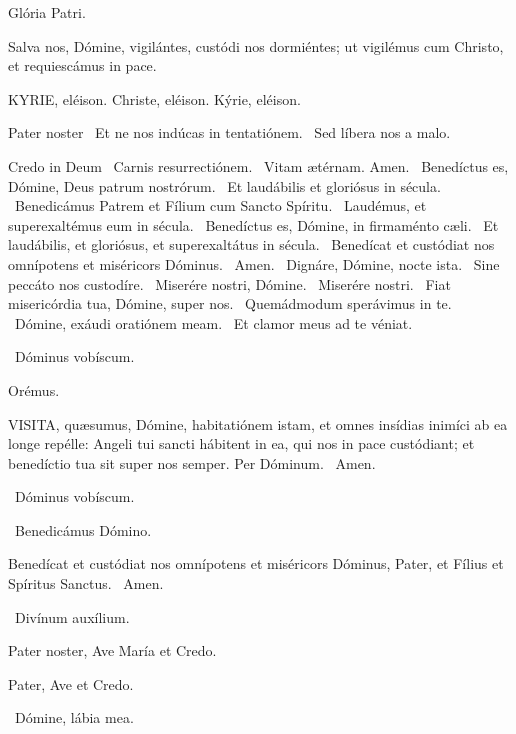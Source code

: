 Glória Patri.

 Salva nos, Dómine, vigilántes, custódi nos dormiéntes; ut vigilémus cum Christo, et requiescámus in pace.



KYRIE, eléison. Christe, eléison. Kýrie, eléison.

Pater noster  \V\ Et ne nos indúcas in tentatiónem. \R\ Sed líbera nos a malo.

Credo in Deum  \V\ Carnis resurrectiónem. \R\ Vitam ætérnam. Amen. \V\ Benedíctus es, Dómine, Deus patrum nostrórum. \R\ Et laudábilis et gloriósus in sécula. \V\ Benedicámus Patrem et Fílium cum Sancto Spíritu. \R\ Laudémus, et superexaltémus eum in sécula. \V\ Benedíctus es, Dómine, in firmaménto cæli. \R\ Et laudábilis, et gloriósus, et superexaltátus in sécula. \V\ Benedícat et custódiat nos omnípotens et miséricors Dóminus. \R\ Amen. \V\ Dignáre, Dómine, nocte ista. \R\ Sine peccáto nos custodíre. \V\ Miserére nostri, Dómine. \R\ Miserére nostri. \V\ Fiat misericórdia tua, Dómine, super nos. \R\ Quemádmodum sperávimus in te. \V\ Dómine, exáudi oratiónem meam. \R\ Et clamor meus ad te véniat.

\sectionornament

\V\ Dóminus vobíscum.

Orémus. 

\lettrine[lines=2]{V}{ISITA}, quæsumus, Dómine, habitatiónem istam, et omnes insídias inimíci ab ea longe repélle: Angeli tui sancti hábitent in ea, qui nos in pace custódiant; et benedíctio tua sit super nos semper. Per Dóminum. \R\ Amen.

\V\ Dóminus vobíscum.

\V\ Benedicámus Dómino.

 Benedícat et custódiat nos omnípotens et miséricors Dóminus, Pater, et Fílius et Spíritus Sanctus. \R\ Amen.


\V\ Divínum auxílium.

Pater noster, Ave María et Credo.



Pater, Ave et Credo.

\V\ Dómine, lábia mea.

